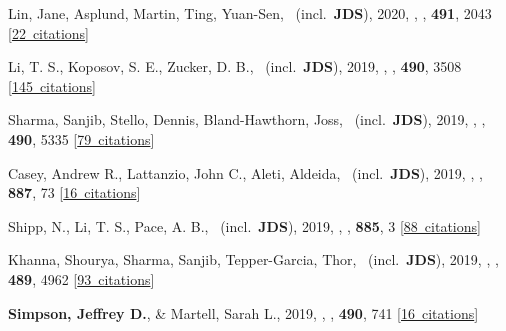 \item[{\color{numcolor}\scriptsize37}] Lin, Jane, Asplund, Martin, Ting, Yuan-Sen, \etal\ (incl.\ \textbf{JDS}), 2020, , \mnras, \textbf{491}, 2043 [\href{https://ui.adsabs.harvard.edu/#abs/2020MNRAS.491.2043L}{22~citations}]

\item[{\color{numcolor}\scriptsize36}] Li, T. S., Koposov, S. E., Zucker, D. B., \etal\ (incl.\ \textbf{JDS}), 2019, , \mnras, \textbf{490}, 3508 [\href{https://ui.adsabs.harvard.edu/#abs/2019MNRAS.490.3508L}{145~citations}]

\item[{\color{numcolor}\scriptsize35}] Sharma, Sanjib, Stello, Dennis, Bland-Hawthorn, Joss, \etal\ (incl.\ \textbf{JDS}), 2019, , \mnras, \textbf{490}, 5335 [\href{https://ui.adsabs.harvard.edu/#abs/2019MNRAS.490.5335S}{79~citations}]

\item[{\color{numcolor}\scriptsize34}] Casey, Andrew R., Lattanzio, John C., Aleti, Aldeida, \etal\ (incl.\ \textbf{JDS}), 2019, , \apj, \textbf{887}, 73 [\href{https://ui.adsabs.harvard.edu/#abs/2019ApJ...887...73C}{16~citations}]

\item[{\color{numcolor}\scriptsize33}] Shipp, N., Li, T. S., Pace, A. B., \etal\ (incl.\ \textbf{JDS}), 2019, , \apj, \textbf{885}, 3 [\href{https://ui.adsabs.harvard.edu/#abs/2019ApJ...885....3S}{88~citations}]

\item[{\color{numcolor}\scriptsize32}] Khanna, Shourya, Sharma, Sanjib, Tepper-Garcia, Thor, \etal\ (incl.\ \textbf{JDS}), 2019, , \mnras, \textbf{489}, 4962 [\href{https://ui.adsabs.harvard.edu/#abs/2019MNRAS.489.4962K}{93~citations}]

\item[{\color{numcolor}\scriptsize31}] \textbf{Simpson, Jeffrey D.}, \& Martell, Sarah L., 2019, , \mnras, \textbf{490}, 741 [\href{https://ui.adsabs.harvard.edu/#abs/2019MNRAS.490..741S}{16~citations}]

